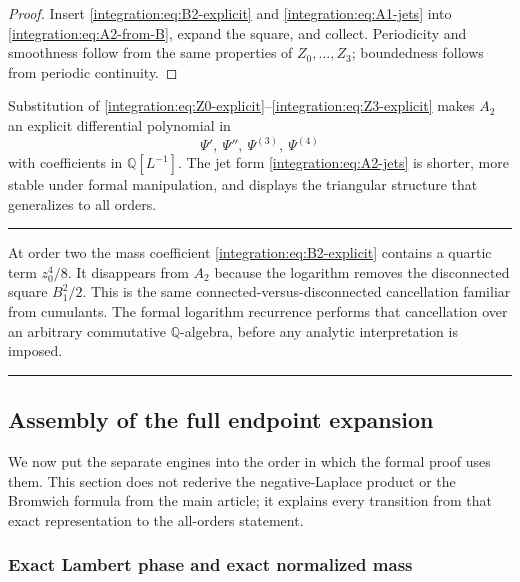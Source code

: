 \documentclass[11pt,oneside]{article}
\theoremstyle{definition}
\theoremstyle{remark}
\newcommand{\Q}{\mathbb Q}
\newenvironment{boxedremark}{%
  \par\smallskip\noindent\begin{center}\begin{minipage}{0.94\textwidth}%
  \color{black}\hrule\vspace{0.6em}\small
}{%
  \vspace{0.6em}\hrule\end{minipage}\end{center}\smallskip
}
\begin{document}
\begin{proof}
Insert \eqref{integration:eq:B2-explicit} and \eqref{integration:eq:A1-jets} into
\eqref{integration:eq:A2-from-B}, expand the square, and collect.  Periodicity and smoothness follow from
the same properties of $Z_0,\ldots,Z_3$; boundedness follows from periodic continuity.
\end{proof}

Substitution of \eqref{integration:eq:Z0-explicit}--\eqref{integration:eq:Z3-explicit} makes
$A_2$ an explicit differential polynomial in
\begin{equation}
 \Psi',\ \Psi'',\ \Psi^{(3)},\ \Psi^{(4)}
 \label{integration:eq:A2-derivatives}
\end{equation}
with coefficients in $\Q[L^{-1}]$.  The jet form \eqref{integration:eq:A2-jets} is shorter, more stable
under formal manipulation, and displays the triangular structure that generalizes to all
orders.

\begin{boxedremark}
At order two the mass coefficient \eqref{integration:eq:B2-explicit} contains a quartic term
$z_0^4/8$.  It disappears from $A_2$ because the logarithm removes the disconnected square
$B_1^2/2$.  This is the same connected-versus-disconnected cancellation familiar from
cumulants.  The formal logarithm recurrence performs that cancellation over an arbitrary
commutative $\Q$-algebra, before any analytic interpretation is imposed.
\end{boxedremark}

\subsection{Assembly of the full endpoint expansion}
\label{integration:sec:full-assembly}

We now put the separate engines into the order in which the formal proof uses them.  This
section does not rederive the negative-Laplace product or the Bromwich formula from the main
article; it explains every transition from that exact representation to the all-orders
statement.

\subsubsection{Exact Lambert phase and exact normalized mass}
\end{document}
